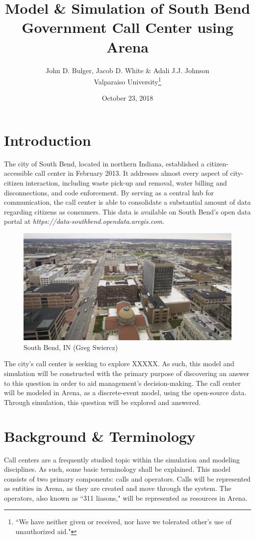 \documentclass[12pt,twocolumn]{article}
\title{Model \& Simulation of South Bend Government Call Center using Arena}
\author{John D. Bulger, Jacob D. White \& Adali J.J. Johnson\\Valparaiso University\thanks{``We have neither given or received, nor have we tolerated other’s use of unauthorized aid."}}
\date{October 23, 2018}
\begin{document}
\maketitle

\section{Introduction}
The city of South Bend, located in northern Indiana, established a citizen-accessible call center in February 2013.  It addresses almost every aspect of city-citizen interaction, including waste pick-up and removal, water billing and disconnections, and code enforcement.  By serving as a central hub for communication, the call center is able to consolidate a substantial amount of data regarding citizens as consumers.  This data is available on South Bend's open data portal at \textit{https://data-southbend.opendata.arcgis.com}.

	\begin{figure}[h]
	\includegraphics[scale=.17]{south_bend.png}
	\caption{South Bend, IN (Greg Swiercz)}
	\end{figure}

\par
The city's call center is seeking to explore XXXXX.  As such, this model and simulation will be constructed with the primary purpose of discovering an answer to this question in order to aid management's decision-making.  The call center will be modeled in Arena, as a discrete-event model, using the open-source data.  Through simulation, this question will be explored and answered.

\section{Background \& Terminology}
Call centers are a frequently studied topic within the simulation and modeling disciplines.  As such, some basic terminology shall be explained.  This model consists of two primary components:  calls and operators.  Calls will be represented as entities in Arena, as they are created and move through the system.  The operators, also known as ``311 liasons," will be represented as resources in Arena.
\end{document}
